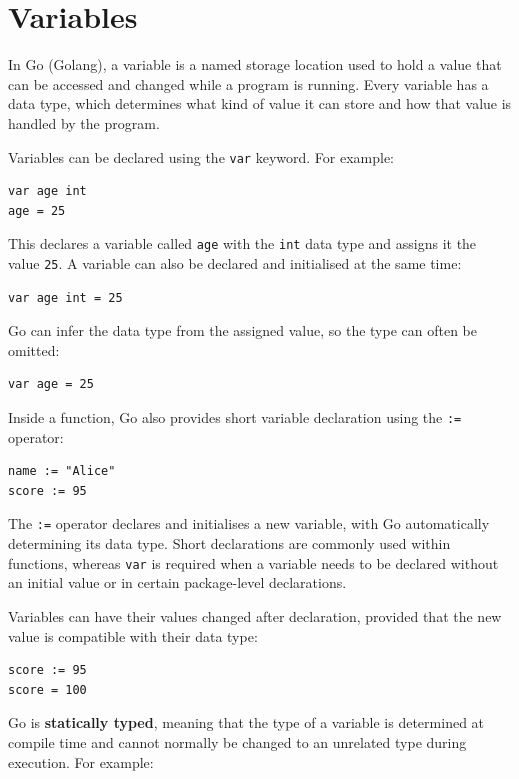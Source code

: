 \section{Variables}

In Go (Golang), a variable is a named storage location used to hold a value
that can be accessed and changed while a program is running. Every variable
has a data type, which determines what kind of value it can store and how that
value is handled by the program.

Variables can be declared using the \texttt{var} keyword. For example:

\begin{lstlisting}
var age int
age = 25
\end{lstlisting}

This declares a variable called \texttt{age} with the \texttt{int} data type
and assigns it the value \texttt{25}. A variable can also be declared and
initialised at the same time:

\begin{lstlisting}
var age int = 25
\end{lstlisting}

Go can infer the data type from the assigned value, so the type can often be
omitted:

\begin{lstlisting}
var age = 25
\end{lstlisting}

Inside a function, Go also provides short variable declaration using the
\texttt{:=} operator:

\begin{lstlisting}
name := "Alice"
score := 95
\end{lstlisting}

The \texttt{:=} operator declares and initialises a new variable, with Go
automatically determining its data type. Short declarations are commonly used
within functions, whereas \texttt{var} is required when a variable needs to be
declared without an initial value or in certain package-level declarations.

Variables can have their values changed after declaration, provided that the
new value is compatible with their data type:

\begin{lstlisting}
score := 95
score = 100
\end{lstlisting}

Go is \textbf{statically typed}, meaning that the type of a variable is
determined at compile time and cannot normally be changed to an unrelated
type during execution. For example:


